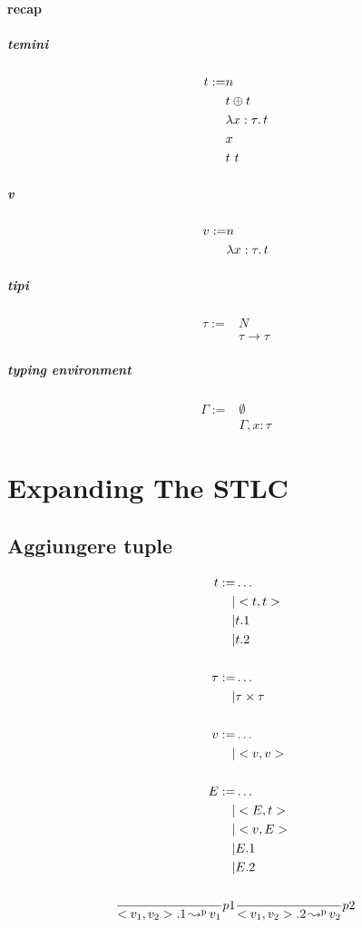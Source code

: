 \documentclass{article}
\newcommand{\bop}[0]{\ensuremath\oplus}
\begin{document}
\paragraph{recap}
\subparagraph{temini}
\begin{align*}
    t := &n \\
         &t\bop t \\
         &\lam{x:\tau}{t} \\
         &x \\
         &t\ t \\
\end{align*}

\subparagraph{v}
\begin{align*}
    v := &n \\
         &\lambda x:\tau\ldotp t \\
\end{align*}

\subparagraph{tipi}
\begin{align*}
    \tau :=&N \\
           &\tau\to\tau
\end{align*}

\subparagraph{typing environment}
\begin{align*}
    \Gamma := &\emptyset \\
              &\Gamma,x:\tau
\end{align*}

\section{Expanding The STLC}
\subsection{Aggiungere tuple}
\begin{align*}
    t := &\dots \\
    |&<t,t> \\
    |&t.1 \\
    |&t.2 \\
    \\
    \tau:= &\dots \\
    |&\tau\times\tau \\
    \\
    v:=&\dots \\
    |&<v,v> \\
    \\
    E := &\dots \\
    |&<E,t> \\
    |&<v,E> \\
    |&E.1 \\
    |&E.2 \\
    \\
    \frac{}{<v_1,v_2>.1\operatorname{ \leadsto^{p} } v_1}p1 & \frac{}{<v_1,v_2>.2\operatorname{ \leadsto^{p} } v_2}p2
\end{align*}
\end{document}
